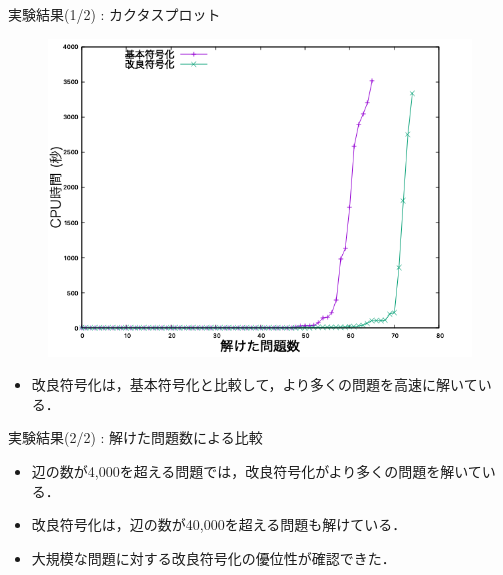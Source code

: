 \begin{frame}{実験結果(1/2) : カクタスプロット}
 \begin{figure}[h]
  \centering
  \includegraphics[scale=0.38]{fig/cactus.png}
 \end{figure}\vfill

\begin{itemize}
 \item 改良符号化は，基本符号化と比較して，より多くの問題を高速に解いている．
\end{itemize}
\end{frame}

\begin{frame}{実験結果(2/2) : 解けた問題数による比較}

\begin{table}[t]
 \centering
 
\end{table}\vfill

\begin{itemize}
\item 辺の数が4,000を超える問題では，改良符号化がより多くの問題を解いている．
\item 改良符号化は，辺の数が40,000を超える問題も解けている．
\item 大規模な問題に対する改良符号化の優位性が確認できた．
\end{itemize}
\end{frame}


